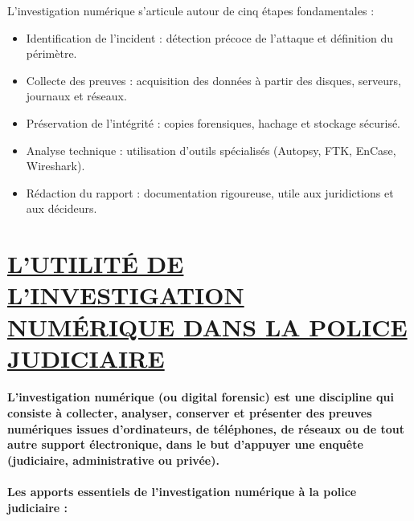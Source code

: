 \documentclass{article}
\begin{document}
L’investigation numérique s’articule autour de cinq étapes fondamentales : 

\begin{itemize}

\item   Identification de l’incident : détection précoce de l’attaque et définition du périmètre.

\item   Collecte des preuves : acquisition des données à partir des disques, serveurs, journaux et réseaux. 

\item   Préservation de l’intégrité : copies forensiques, hachage et stockage sécurisé. 

\item   Analyse technique : utilisation d’outils spécialisés (Autopsy, FTK, EnCase, Wireshark).  

\item  Rédaction du rapport : documentation rigoureuse, utile aux juridictions et aux décideurs. 


\end{itemize}


\section{\underline{ L’UTILITÉ DE L’INVESTIGATION NUMÉRIQUE DANS LA POLICE JUDICIAIRE}}

\paragraph{L’investigation numérique (ou digital forensic) est une discipline qui consiste
 à collecter, analyser, conserver et présenter des preuves numériques issues d’ordinateurs, de téléphones, de réseaux ou de tout autre support électronique, dans le but d’appuyer une enquête (judiciaire, administrative ou privée).}

\paragraph{Les apports essentiels de l’investigation numérique à la police judiciaire :}
\end{document}
